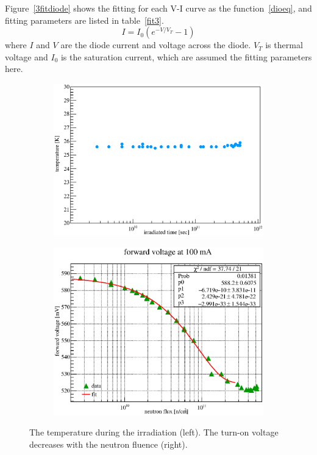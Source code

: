 Figure~\ref{3fitdiode} shows the fitting for each V-I curve as the function~\ref{dioeq}, and fitting parameters are listed in table~\ref{fit3}.
\begin{equation}
 I = I_0 (e^{-V/V_T} - 1)
\label{dioeq}
\end{equation}
where $I$ and $V$ are the diode current and voltage across the diode.
$V_T$ is thermal voltage and $I_0$ is the saturation current, which are assumed the fitting parameters here.
  \begin{figure}[H]
   \begin{subfigure}{0.3\textwidth}
    \centering
	\includegraphics[scale=0.43]{chapter4/fig/temperature.eps}
   \end{subfigure}
   \hspace{0.2\textwidth}
   \begin{subfigure}{0.3\textwidth}
    \centering
	\includegraphics[scale=0.43]{chapter4/fig/switchon.eps}
   \end{subfigure}
   \caption{The temperature during the irradiation (left). The turn-on voltage decreases with the neutron fluence (right).}
   \label{3switch}
  \end{figure}
